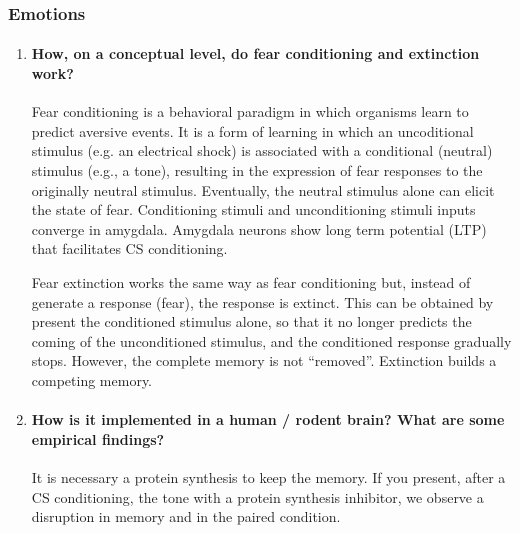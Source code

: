 \documentclass[12pt,article,oneside,a4paper]{memoir}
\begin{document}
\subsubsection{Emotions}
\begin{enumerate}
\item \paragraph{How, on a conceptual level, do fear conditioning and
extinction work?}
Fear conditioning is a behavioral paradigm in which organisms learn to predict
aversive events. It is a form of learning in which an uncoditional stimulus
(e.g. an electrical shock) is associated with a conditional (neutral) stimulus
(e.g., a tone), resulting in the expression of fear responses to the originally
neutral stimulus. Eventually, the neutral stimulus alone can elicit the state
of fear. Conditioning stimuli and unconditioning stimuli inputs converge in
amygdala. Amygdala neurons show long term potential (LTP) that facilitates CS
conditioning.

Fear extinction works the same way as fear conditioning but, instead of generate
a response (fear), the response is extinct. This can be obtained by present the
conditioned stimulus alone, so that it no longer predicts the coming of the
unconditioned stimulus, and the conditioned response gradually stops. However,
the complete memory is not ``removed''. Extinction builds a competing memory.

\item \paragraph{How is it implemented in a human / rodent brain? What are some
empirical findings?}

It is necessary a protein synthesis to keep the memory. If you present, after a CS conditioning, the tone with a protein synthesis inhibitor, we observe a disruption in memory and in the paired condition.

\end{enumerate}

\end{document}
